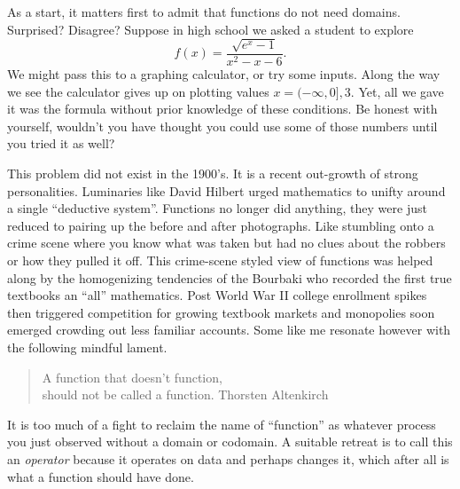 As a start, it matters first to admit that functions do not need 
domains.  Surprised? Disagree?    Suppose in high school we asked 
a student to  explore
\[
    f(x) = \frac{\sqrt{e^x-1}}{x^2-x-6}.
\]
We might pass this to a graphing calculator, or try some inputs. Along the way
we see the calculator gives up on plotting values $x=(-\infty,0],3$.  Yet, all
we gave it was the formula without prior knowledge of these conditions.  
Be honest with yourself, wouldn't you have thought you could use some of 
those numbers until you tried it as well?  

This problem did not exist in the 1900's.  It is a recent out-growth of strong 
personalities.  Luminaries like David Hilbert urged mathematics to unifty 
around a single ``deductive system''.  Functions no longer did anything, they 
were just reduced to pairing up the before and after photographs.  Like stumbling 
onto a crime scene where you know what was taken but had no clues about the robbers 
or how they pulled it off.  This crime-scene styled view of functions was 
helped along by the homogenizing tendencies of the Bourbaki who recorded the 
first true textbooks an ``all'' mathematics.
Post World War II college enrollment spikes then triggered 
competition for growing textbook markets and monopolies soon emerged crowding 
out less familiar accounts.  Some like me resonate however with the following 
mindful lament.
\begin{quote}
    A function that doesn't function,\\
    should not be called a function.
    \hfill Thorsten Altenkirch
\end{quote}

It is too much of a fight to reclaim the 
name of ``function'' as whatever process you just observed without a domain 
or codomain.  A suitable retreat is to call this an \emph{operator} because 
it operates on data and perhaps changes it, which after all is what a function should have done.

